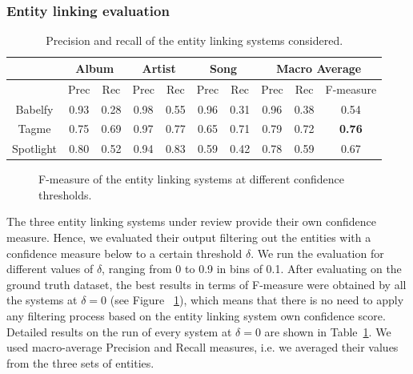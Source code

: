 \subsubsection{Entity linking evaluation}

\begin{table}[]
\scriptsize
\centering
	\begin{tabular}{ c c c c c c c c c c }
	\hline
& \multicolumn{2}{c}{Album} & \multicolumn{2}{c}{Artist} & \multicolumn{2}{c}{Song} & \multicolumn{3}{c}{Macro Average}  \\
\hline
	& Prec & Rec & Prec & Rec & Prec & Rec & Prec & Rec & F-measure \\
	\hline
Babelfy & 0.93 & 0.28 & 0.98 & 0.55 & 0.96 & 0.31 & 0.96 & 0.38 & 0.54 \\
Tagme & 0.75 & 0.69 & 0.97 & 0.77 & 0.65 & 0.71 & 0.79 & 0.72 & \textbf{0.76} \\
Spotlight & 0.80 & 0.52 & 0.94 & 0.83 & 0.59 & 0.42 & 0.78 & 0.59 & 0.67 \\
\hline
	\end{tabular}
	\caption{Precision and recall of the entity linking systems considered.}
	\label{tbl:kb:res_categories}
\end{table}

\begin{figure}[!htp]
\centerline{}
\caption[F-measure of the entity linking systems at different thresholds.]{F-measure of the entity linking systems at different confidence thresholds.}
\label{fig:kb:confidence_el}
\end{figure}

The three entity linking systems under review provide their own confidence measure. Hence, we evaluated their output filtering out the entities with a confidence measure below to a certain threshold $\delta$. We run the evaluation for different values of $\delta$, ranging from 0 to 0.9 in bins of 0.1. After evaluating on the ground truth dataset, the best results in terms of F-measure were obtained by all the systems at $\delta = 0$ (see Figure ~\ref{fig:kb:confidence_el}), which means that there is no need to apply any filtering process based on the entity linking system own confidence score. Detailed results on the run of every system at $\delta = 0$ are shown in Table~\ref{tbl:kb:res_categories}. We used macro-average Precision and Recall measures, i.e. we averaged their values from the three sets of entities.

